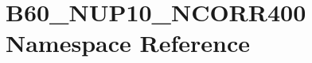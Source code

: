 \hypertarget{namespace_b60___n_u_p10___n_c_o_r_r400}{}\section{B60\+\_\+\+N\+U\+P10\+\_\+\+N\+C\+O\+R\+R400 Namespace Reference}
\label{namespace_b60___n_u_p10___n_c_o_r_r400}
